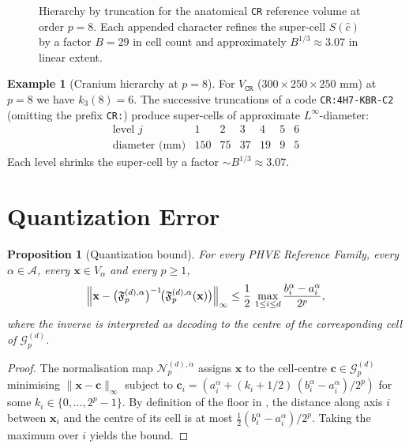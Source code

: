 \documentclass[11pt,a4paper]{article}
\theoremstyle{plain}
\newtheorem{proposition}[theorem]{Proposition}
\theoremstyle{definition}
\newtheorem{example}[theorem]{Example}
\theoremstyle{remark}
\newcommand{\Nor}{\mathcal{N}}
\newcommand{\Fc}{\mathfrak{F}}
\newcommand{\Grid}{\mathcal{G}}
\begin{document}
\begin{figure}[!htbp]
  \centering
  
  \caption{Hierarchy by truncation for the anatomical \texttt{CR} reference
  volume at order $p=8$. Each appended character refines the super-cell
  $S(\hat c)$ by a factor $B=29$ in cell count and approximately
  $B^{1/3}\approx 3.07$ in linear extent.}
  \label{fig:truncation}
\end{figure}

\begin{example}[Cranium hierarchy at $p=8$]\label{ex:truncation_cr}
For $V_{\mathtt{CR}}$ ($300\times 250\times 250$ mm) at $p=8$ we have
$k_3(8)=6$. The successive truncations of a code
\texttt{CR:4H7-KBR-C2} (omitting the prefix \texttt{CR:})
produce super-cells of approximate $L^\infty$-diameter:
\[
\begin{array}{c|cccccc}
\text{level }j & 1 & 2 & 3 & 4 & 5 & 6 \\\hline
\text{diameter (mm)} & 150 & 75 & 37 & 19 & 9 & 5
\end{array}
\]
Each level shrinks the super-cell by a factor $\sim B^{1/3}\approx 3.07$.
\end{example}

\section{Quantization Error}\label{sec:error}

\begin{proposition}[Quantization bound]\label{prop:quantization}
For every PHVE Reference Family, every $\alpha\in\mathcal{A}$, every
$\mathbf{x}\in V_\alpha$ and every $p\geq 1$,
\[
\Bigl\|\mathbf{x}
-\bigl(\Fc_p^{(d),\alpha}\bigr)^{-1}\!\bigl(\Fc_p^{(d),\alpha}(\mathbf{x})\bigr)
\Bigr\|_\infty \leq \frac{1}{2}\, \max_{1\leq i\leq d}
\frac{b_i^\alpha-a_i^\alpha}{2^p},
\]
where the inverse is interpreted as decoding to the centre of the
corresponding cell of $\Grid_p^{(d)}$.
\end{proposition}

\begin{proof}
The normalisation map $\Nor_p^{(d),\alpha}$ assigns $\mathbf{x}$ to the
cell-centre $\mathbf{c}\in\Grid_p^{(d)}$ minimising
$\|\mathbf{x}-\mathbf{c}\|_\infty$ subject to
$\mathbf{c}_i = (a_i^\alpha + (k_i+1/2)\,(b_i^\alpha-a_i^\alpha)/2^p)$ for
some $k_i\in\{0,\dots,2^p-1\}$. By definition of the floor in
, the distance along axis $i$ between $\mathbf{x}_i$
and the centre of its cell is at most
$\tfrac12 (b_i^\alpha-a_i^\alpha)/2^p$. Taking the maximum over $i$
yields the bound.
\end{proof}
\end{document}

